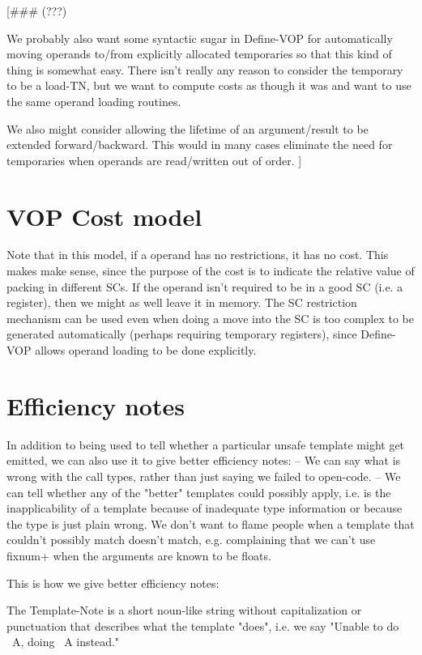 [\#\#\# (???)

We probably also want some syntactic sugar in Define-VOP for automatically
moving operands to/from explicitly allocated temporaries so that this kind of
thing is somewhat easy.  There isn't really any reason to consider the
temporary to be a load-TN, but we want to compute costs as though it was and
want to use the same operand loading routines.

We also might consider allowing the lifetime of an argument/result to be
extended forward/backward.  This would in many cases eliminate the need for
temporaries when operands are read/written out of order.
]


\section{VOP Cost model}

Note that in this model, if a operand has no restrictions, it has no cost.
This makes make sense, since the purpose of the cost is to indicate the
relative value of packing in different SCs.  If the operand isn't required to
be in a good SC (i.e. a register), then we might as well leave it in memory.
The SC restriction mechanism can be used even when doing a move into the SC is
too complex to be generated automatically (perhaps requiring temporary
registers), since Define-VOP allows operand loading to be done explicitly.


\section{Efficiency notes}

  In addition to
being used to tell whether a particular unsafe template might get emitted, we
can also use it to give better efficiency notes:
 -- We can say what is wrong with the call types, rather than just saying we
    failed to open-code.
 -- We can tell whether any of the "better" templates could possibly apply,
    i.e. is the inapplicability of a template because of inadequate type
    information or because the type is just plain wrong.  We don't want to
    flame people when a template that couldn't possibly match doesn't match,
    e.g. complaining that we can't use fixnum+ when the arguments are known to
    be floats.


This is how we give better efficiency notes:

The Template-Note is a short noun-like string without capitalization or
punctuation that describes what the template "does", i.e. we say
"Unable to do ~A, doing ~A instead."

